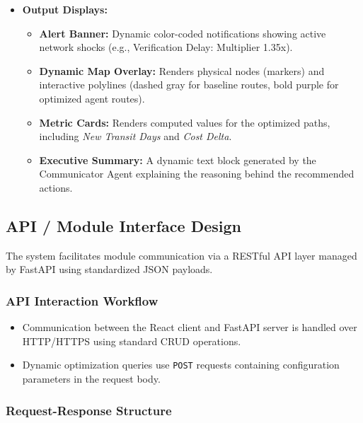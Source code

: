 \begin{itemize}
\begin{itemize}
        \item \textbf{Action Button:} A single high-contrast button labeled \texttt{Run Optimization} triggers the background agentic pipeline.
    \end{itemize}
    \item \textbf{Output Displays:}
    \begin{itemize}
        \item \textbf{Alert Banner:} Dynamic color-coded notifications showing active network shocks (e.g., Verification Delay: Multiplier 1.35x).
        \item \textbf{Dynamic Map Overlay:} Renders physical nodes (markers) and interactive polylines (dashed gray for baseline routes, bold purple for optimized agent routes).
        \item \textbf{Metric Cards:} Renders computed values for the optimized paths, including \textit{New Transit Days} and \textit{Cost Delta}.
        \item \textbf{Executive Summary:} A dynamic text block generated by the Communicator Agent explaining the reasoning behind the recommended actions.
    \end{itemize}
\end{itemize}

\subsection[API / Module Interface Design]{API / Module Interface Design}

The system facilitates module communication via a RESTful API layer managed by FastAPI using standardized JSON payloads.

\subsubsection{API Interaction Workflow}
\begin{itemize}
    \item Communication between the React client and FastAPI server is handled over HTTP/HTTPS using standard CRUD operations.
    \item Dynamic optimization queries use \texttt{POST} requests containing configuration parameters in the request body.
\end{itemize}

\subsubsection{Request-Response Structure}

